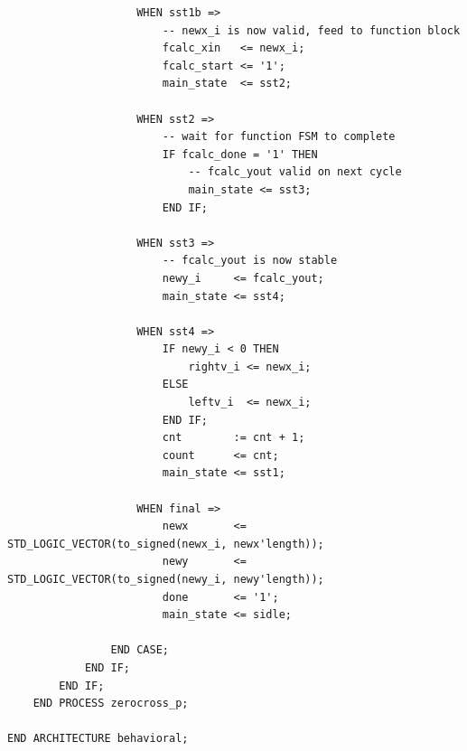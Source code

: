 \documentclass[11pt, a4paper]{report}
\begin{document}
\begin{verbatim}
                    WHEN sst1b =>
                        -- newx_i is now valid, feed to function block
                        fcalc_xin   <= newx_i;
                        fcalc_start <= '1';
                        main_state  <= sst2;

                    WHEN sst2 =>
                        -- wait for function FSM to complete
                        IF fcalc_done = '1' THEN
                            -- fcalc_yout valid on next cycle
                            main_state <= sst3;
                        END IF;

                    WHEN sst3 =>
                        -- fcalc_yout is now stable
                        newy_i     <= fcalc_yout;
                        main_state <= sst4;

                    WHEN sst4 =>
                        IF newy_i < 0 THEN
                            rightv_i <= newx_i;
                        ELSE
                            leftv_i  <= newx_i;
                        END IF;
                        cnt        := cnt + 1;
                        count      <= cnt;
                        main_state <= sst1;

                    WHEN final =>
                        newx       <= STD_LOGIC_VECTOR(to_signed(newx_i, newx'length));
                        newy       <= STD_LOGIC_VECTOR(to_signed(newy_i, newy'length));
                        done       <= '1';
                        main_state <= sidle;

                END CASE;
            END IF;
        END IF;
    END PROCESS zerocross_p;

END ARCHITECTURE behavioral;
\end{verbatim}
\end{document}
